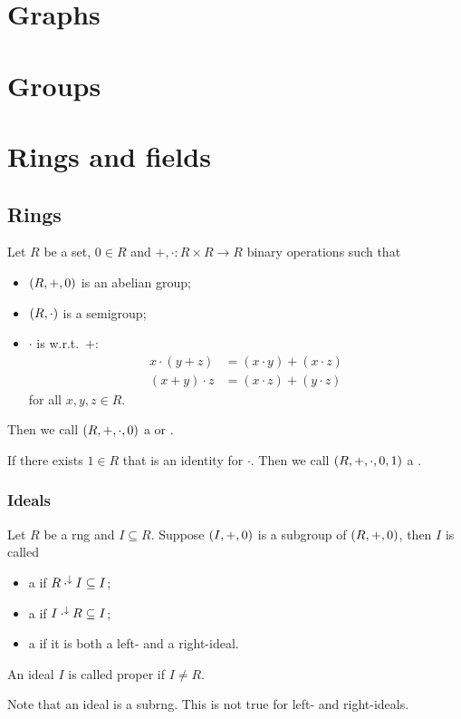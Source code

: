 \chapter{Graphs}


\chapter{Groups}



\chapter{Rings and fields}
\section{Rings}
\begin{definition}
Let $R$ be a set, $0\in R$ and $+,\cdot: R\times R\to R$ binary operations such that
\begin{itemize}
\item $\left( R,+,0 \right)$ is an abelian group;
\item $\left( R,\cdot \right)$ is a semigroup;
\item $\cdot$ is  w.r.t.\ $+$:
\begin{align*}
x\cdot (y+z) &= (x\cdot y) + (x\cdot z) \\
(x+y)\cdot z &= (x\cdot z) + (y\cdot z)
\end{align*}
for all $x,y,z\in R$.
\end{itemize}
Then we call $\left( R, +,\cdot, 0 \right)$ a  or .

If there exists $1\in R$ that is an identity for $\cdot$. Then we call $\left( R,+,\cdot,0,1 \right)$ a .
\end{definition}

\subsection{Ideals}
\begin{definition}
Let $R$ be a rng and $I\subseteq R$. Suppose $\left( I,+,0 \right)$ is a subgroup of $\left( R,+,0 \right)$, then $I$ is called
\begin{itemize}
\item a  if $R\cdot^\downarrow I \subseteq I$;
\item a  if $I\cdot^\downarrow R \subseteq I$;
\item a  if it is both a left- and a right-ideal.
\end{itemize}
An ideal $I$ is called proper if $I\neq R$.
\end{definition}
Note that an ideal is a subrng. This is not true for left- and right-ideals.

